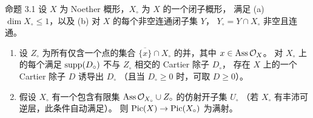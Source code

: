 \begin{enonce*}{命题 3.1}
设 $X$ 为 Noether 概形，$X_{\circ}$ 为 $X$ 的一个闭子概形，
满足 \textup{(a)} $\dim X_{\circ}\leq1$，以及
\textup{(b)} 对 $X$ 的每个非空连通闭子集 $Y$，
$Y_{\circ}=Y\cap X_{\circ}$ 非空且连通。
\begin{enumerate}
\renewcommand{\theenumi}{\roman{enumi}}
\renewcommand{\labelenumi}{(\theenumi)}
\item 设 $Z_{\circ}$ 为所有仅含一个点的集合
$\overline{\{x\}}\cap X_{\circ}$ 的并，其中 $x\in\operatorname{Ass}{\mathcal O}_X$。
对 $X_{\circ}$ 上的每个满足 $\operatorname{supp}(D_{\circ})$ 不与
$Z_{\circ}$ 相交的 Cartier 除子 $D_{\circ}$，
存在 $X$ 上的一个 Cartier 除子 $D$ 诱导出 $D_{\circ}$
（且当 $D_{\circ}\geq0$ 时，可取 $D\geq0$）。

\item 假设 $X_{\circ}$ 有一个包含有限集
$\operatorname{Ass}{\mathcal O}_{X_{\circ}}\cup Z_{\circ}$ 的仿射开子集 $U_{\circ}$
（若 $X_{\circ}$ 有丰沛可逆层，此条件自动满足）。
则 $\operatorname{Pic}(X)\rightarrow\operatorname{Pic}(X_{\circ})$ 为满射。
\end{enumerate}
\end{enonce*}

